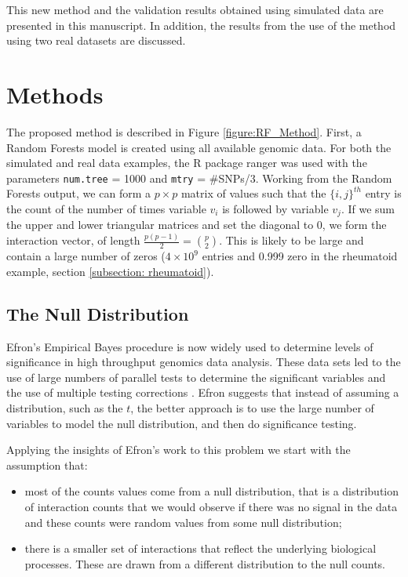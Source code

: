 \documentclass[preprint,12pt,3p]{elsarticle}
\begin{document}
This new method and the validation results obtained using simulated data are presented in this manuscript. In
addition, the results from the use of the method using two real datasets are discussed.


\section{Methods}

The proposed method is described in Figure \ref{figure:RF_Method}. First, a Random Forests model is created using all
available genomic data. For both the simulated and real data examples, the R package ranger
\cite[]{Wright.and.Ziegler.2017} was used with the parameters \texttt{num.tree} = 1000 and \texttt{mtry} = \#SNPs/3.
Working from the Random Forests output, we can form a $p \times p$ matrix of values such that the $\{i,j\}^{th}$ entry is the count of the
number of times variable $v_i$ is followed by variable $v_j$.  If we sum the upper and lower triangular matrices and set the diagonal to 0,
we form the interaction vector, of length $\frac {p(p-1)} 2 = {p \choose 2}$.  This is likely to be large and contain a large number of
zeros ($4 \times 10^9$ entries and 0.999 zero in the rheumatoid example, section \ref{subsection: rheumatoid}).

\subsection{The Null Distribution}

Efron's Empirical Bayes procedure \cite[]{efronLargeScaleInferenceEmpirical2010} is now widely used to determine levels of significance in
high throughput genomics data analysis.  These data sets led to the use of large numbers of parallel tests to determine the significant
variables and the use of multiple testing corrections \cite{limma.2015}.  Efron suggests that instead of assuming a distribution, such as
the $t$, the better approach is to use the large number of variables to model the null distribution, and then do significance testing.


Applying the insights of Efron's work to this problem we start with the assumption that:
\begin{itemize}
\item most of the counts values come from a null distribution, that is a distribution of interaction
  counts that we would observe if there was no signal in the data and these counts were random values from some null distribution;
\item there is a smaller set of interactions that reflect the underlying biological processes. These are drawn from a
  different distribution to the null counts.
\end{itemize}
\end{document}
